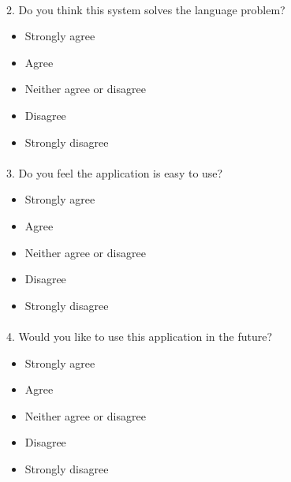 \documentclass[12pt]{article}
\begin{document}
\paragraph{}

\paragraph{}2. Do you think this system solves the language problem?
\begin{itemize}
	\item Strongly agree
	\item Agree
	\item Neither agree or disagree
	\item Disagree
	\item Strongly disagree
\end{itemize}
\paragraph{}

\paragraph{}3. Do you feel the application is easy to use?
\begin{itemize}
	\item Strongly agree
	\item Agree
	\item Neither agree or disagree
	\item Disagree
	\item Strongly disagree
\end{itemize}
\paragraph{}

\paragraph{}4. Would you like to use this application in the future?
\begin{itemize}
	\item Strongly agree
	\item Agree
	\item Neither agree or disagree
	\item Disagree
	\item Strongly disagree
\end{itemize}
\end{document}
